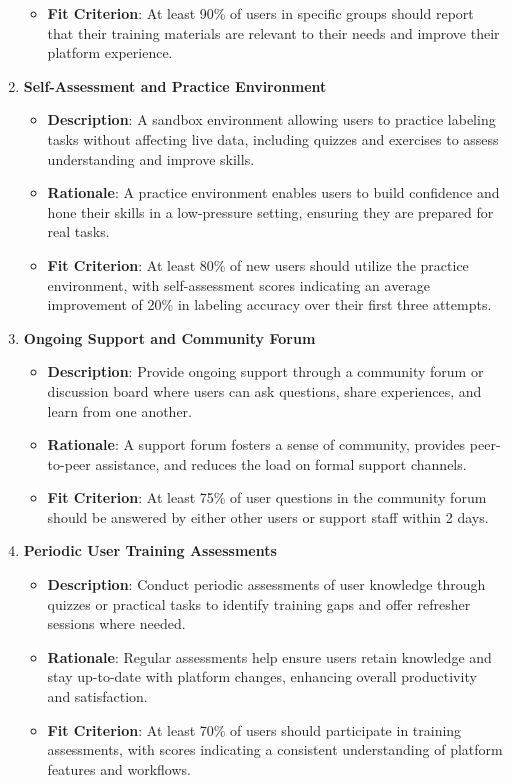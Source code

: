 \documentclass[12pt]{article}
\begin{document}
\begin{enumerate}
\begin{itemize}
            \item \textbf{Fit Criterion}: At least 90\% of users in specific groups should report that their training materials are relevant to their needs and improve their platform experience.
        \end{itemize}
    \item \textbf{Self-Assessment and Practice Environment}  
        \begin{itemize} 
            \item \textbf{Description}: A sandbox environment allowing users to practice labeling tasks without affecting live data, including quizzes and exercises to assess understanding and improve skills.  
            \item \textbf{Rationale}: A practice environment enables users to build confidence and hone their skills in a low-pressure setting, ensuring they are prepared for real tasks.  
            \item \textbf{Fit Criterion}: At least 80\% of new users should utilize the practice environment, with self-assessment scores indicating an average improvement of 20\% in labeling accuracy over their first three attempts.
        \end{itemize}
    \item \textbf{Ongoing Support and Community Forum}  
        \begin{itemize} 
            \item \textbf{Description}: Provide ongoing support through a community forum or discussion board where users can ask questions, share experiences, and learn from one another.  
            \item \textbf{Rationale}: A support forum fosters a sense of community, provides peer-to-peer assistance, and reduces the load on formal support channels.  
            \item \textbf{Fit Criterion}: At least 75\% of user questions in the community forum should be answered by either other users or support staff within 2 days.
        \end{itemize}
    \item \textbf{Periodic User Training Assessments}  
        \begin{itemize} 
            \item \textbf{Description}: Conduct periodic assessments of user knowledge through quizzes or practical tasks to identify training gaps and offer refresher sessions where needed.  
            \item \textbf{Rationale}: Regular assessments help ensure users retain knowledge and stay up-to-date with platform changes, enhancing overall productivity and satisfaction.  
            \item \textbf{Fit Criterion}: At least 70\% of users should participate in training assessments, with scores indicating a consistent understanding of platform features and workflows.
        \end{itemize}
\end{enumerate}
\end{document}
